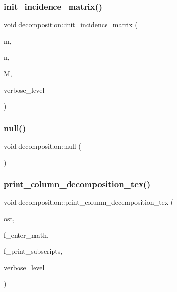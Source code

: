 \subsubsection{\texorpdfstring{init\+\_\+incidence\+\_\+matrix()}{init\_incidence\_matrix()}}
{\footnotesize\ttfamily void decomposition\+::init\+\_\+incidence\+\_\+matrix (\begin{DoxyParamCaption}\item[{\mbox{\hyperlink{galois_8h_a09fddde158a3a20bd2dcadb609de11dc}{I\+NT}}}]{m,  }\item[{\mbox{\hyperlink{galois_8h_a09fddde158a3a20bd2dcadb609de11dc}{I\+NT}}}]{n,  }\item[{\mbox{\hyperlink{galois_8h_a09fddde158a3a20bd2dcadb609de11dc}{I\+NT}} $\ast$}]{M,  }\item[{\mbox{\hyperlink{galois_8h_a09fddde158a3a20bd2dcadb609de11dc}{I\+NT}}}]{verbose\+\_\+level }\end{DoxyParamCaption})}

\mbox{\label{classdecomposition_aedb7655f8968880b5dfd3a4e6ebdb9d7}} 
\subsubsection{\texorpdfstring{null()}{null()}}
{\footnotesize\ttfamily void decomposition\+::null (\begin{DoxyParamCaption}{ }\end{DoxyParamCaption})}

\mbox{\label{classdecomposition_a68897261ef26c6df5d8c299356e90dbd}} 
\subsubsection{\texorpdfstring{print\+\_\+column\+\_\+decomposition\+\_\+tex()}{print\_column\_decomposition\_tex()}}
{\footnotesize\ttfamily void decomposition\+::print\+\_\+column\+\_\+decomposition\+\_\+tex (\begin{DoxyParamCaption}\item[{ostream \&}]{ost,  }\item[{\mbox{\hyperlink{galois_8h_a09fddde158a3a20bd2dcadb609de11dc}{I\+NT}}}]{f\+\_\+enter\+\_\+math,  }\item[{\mbox{\hyperlink{galois_8h_a09fddde158a3a20bd2dcadb609de11dc}{I\+NT}}}]{f\+\_\+print\+\_\+subscripts,  }\item[{\mbox{\hyperlink{galois_8h_a09fddde158a3a20bd2dcadb609de11dc}{I\+NT}}}]{verbose\+\_\+level }\end{DoxyParamCaption})}

